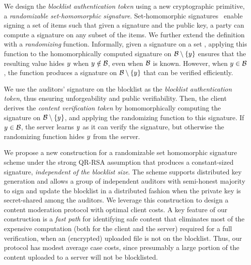 %
We design the \emph{blocklist authentication token} using a new cryptographic primitive, a \emph{randomizable set-homomorphic
signature}. Set-homomorphic signatures~\cite{johnson2002homomorphic} enable signing a set of items such that given a
signature and the public key, a party can compute a signature
on any subset of the items. We further extend the definition with a \emph{randomizing} function. Informally, given a signature on a
set \blocklist, applying this function to the homomorphically computed
signature on $\blocklist \setminus \{\genericCInputElmt\}$ ensures
that the resulting value hides $\genericCInputElmt$ when
$\genericCInputElmt \notin \blocklist$, even when $\blocklist$ is
known. However, when $\genericCInputElmt \in \blocklist$, the function
produces a signature on $\blocklist \setminus
\{\genericCInputElmt\}$ that can be verified efficiently. 
%


We use the auditors' signature on the
blocklist \blocklist as the \emph{blocklist authentication token}, thus ensuring unforgeability and public verifiability. 
Then, the client derives the \emph{content verification token} by homomorphically computing the signature
on $\blocklist \setminus \{\genericCInputElmt\}$, and applying the
randomizing function to this signature. If $\genericCInputElmt \in
\blocklist$, the server learns $\genericCInputElmt$ as it can verify
the signature, but otherwise the randomizing function hides
$\genericCInputElmt$ from the server. 

We propose a new construction for a
randomizable set homomorphic signature scheme under the strong QR-RSA assumption that produces a constant-sized signature, \emph{independent 
of the blocklist size}. The scheme supports distributed key generation and allows a group of independent auditors with semi-honest majority to sign and update the blocklist in a distributed fashion when the private key is secret-shared among the auditors. We leverage this construction to design a content moderation protocol with optimal client costs. A key feature of our construction is a \emph{fast path} for identifying safe content that eliminates most of the expensive computation (both for the client and the server) required for a full verification, when an (encrypted) uploaded file is not on the blocklist. Thus, our protocol has modest average case costs, since presumably a large portion of the content uploaded to a server will not be blocklisted. 

